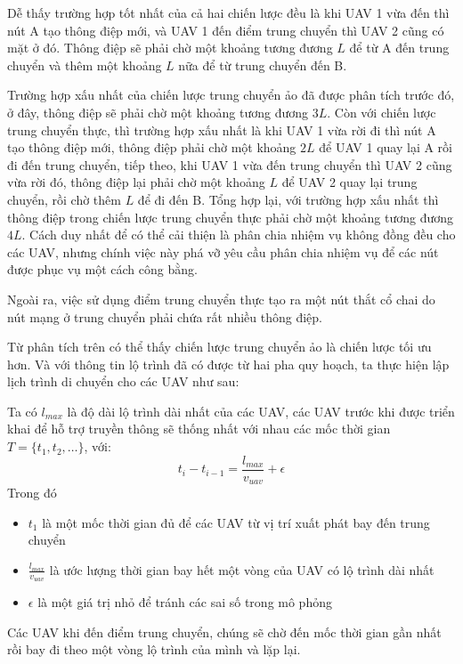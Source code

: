 \documentclass[a4paper]{article}
\begin{document}
Dễ thấy trường hợp tốt nhất của cả hai chiến lược đều là khi UAV 1 vừa đến thì nút A tạo thông điệp mới, và UAV 1 đến điểm trung chuyển thì UAV 2 cũng có mặt ở đó. Thông điệp sẽ phải chờ một khoảng tương đương $L$ để từ A đến trung chuyển và thêm một khoảng $L$ nữa để từ trung chuyển đến B.

Trường hợp xấu nhất của chiến lược trung chuyển ảo đã được phân tích trước đó, ở đây, thông điệp sẽ phải chờ một khoảng tương đương $3L$. Còn với chiến lược trung chuyển thực, thì trường hợp xấu nhất là khi UAV 1 vừa rời đi thì nút A tạo thông điệp mới, thông điệp phải chờ một khoảng $2L$ để UAV 1 quay lại A rồi đi đến trung chuyển, tiếp theo, khi UAV 1 vừa đến trung chuyển thì UAV 2 cũng vừa rời đó, thông điệp lại phải chờ một khoảng $L$ để UAV 2 quay lại trung chuyển, rồi chờ thêm $L$ để đi đến B. Tổng hợp lại, với trường hợp xấu nhất thì thông điệp trong chiến lược trung chuyển thực phải chờ một khoảng tương đương $4L$. Cách duy nhất để có thể cải thiện là phân chia nhiệm vụ không đồng đều cho các UAV, nhưng chính việc này phá vỡ yêu cầu phân chia nhiệm vụ để các nút được phục vụ một cách công bằng.

Ngoài ra, việc sử dụng điểm trung chuyển thực tạo ra một nút thắt cổ chai do nút mạng ở trung chuyển phải chứa rất nhiều thông điệp.

Từ phân tích trên có thể thấy chiến lược trung chuyển ảo là chiến lược tối ưu hơn. Và với thông tin lộ trình đã có được từ hai pha quy hoạch, ta thực hiện lập lịch trình di chuyển cho các UAV như sau:

Ta có $l_{max}$ là độ dài lộ trình dài nhất của các UAV, các UAV trước khi được triển khai để hỗ trợ truyền thông sẽ thống nhất với nhau các mốc thời gian $T = \{t_1, t_2, \dots\}$, với:
\begin{equation}
  t_i - t_{i-1} = \frac{l_{max}}{ v_{uav}} + \epsilon
\end{equation}
Trong đó
\begin{itemize}
  \item $t_1$ là một mốc thời gian đủ để các UAV từ vị trí xuất phát bay đến trung chuyển
  \item $\frac{l_{max}}{ v_{uav}}$ là ước lượng thời gian bay hết một vòng của UAV có lộ trình dài nhất
  \item $\epsilon$ là một giá trị nhỏ để tránh các sai số trong mô phỏng
\end{itemize}
Các UAV khi đến điểm trung chuyển, chúng sẽ chờ đến mốc thời gian gần nhất rồi bay đi theo một vòng lộ trình của mình và lặp lại.
\end{document}
